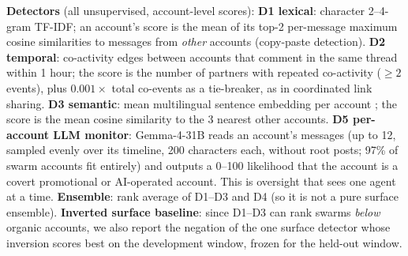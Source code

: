 \documentclass[10pt]{article}
\begin{document}
\textbf{Detectors} (all unsupervised, account-level scores):
\textbf{D1 lexical}: character 2--4-gram TF-IDF; an account's score is the mean of its top-2 per-message maximum cosine similarities to messages from \emph{other} accounts (copy-paste detection).
\textbf{D2 temporal}: co-activity edges between accounts that comment in the same thread within 1 hour; the score is the number of partners with repeated co-activity ($\geq 2$ events), plus $0.001\times$ total co-events as a tie-breaker, as in coordinated link sharing.
\textbf{D3 semantic}: mean multilingual sentence embedding per account \citep{reimers2020multilingual}; the score is the mean cosine similarity to the 3 nearest other accounts.
\textbf{D5 per-account LLM monitor}: Gemma-4-31B reads an account's messages (up to 12, sampled evenly over its timeline, 200 characters each, without root posts; 97\% of swarm accounts fit entirely) and outputs a 0--100 likelihood that the account is a covert promotional or AI-operated account. This is oversight that sees one agent at a time.
\textbf{Ensemble}: rank average of D1--D3 and D4 (so it is not a pure surface ensemble).
\textbf{Inverted surface baseline}: since D1--D3 can rank swarms \emph{below} organic accounts, we also report the negation of the one surface detector whose inversion scores best on the development window, frozen for the held-out window.
\end{document}
